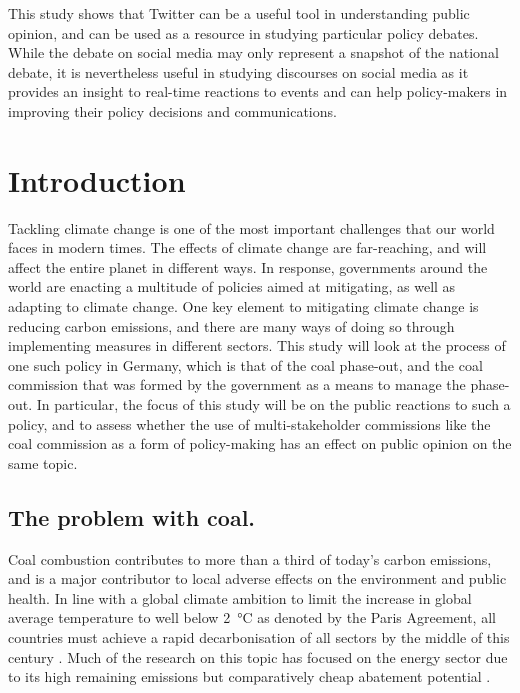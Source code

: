 \documentclass[12pt,onecolumn,twoside]{layout}
\begin{document}
This study shows that Twitter can be a useful tool in understanding public opinion, and can be used as a resource in studying particular policy debates. While the debate on social media may only represent a snapshot of the national debate, it is nevertheless useful in studying discourses on social media as it provides an insight to real-time reactions to events and can help policy-makers in improving their policy decisions and communications. 


\clearpage
\section{Introduction} \label{sec:introduction}
Tackling climate change is one of the most important challenges that our world faces in modern times. The effects of climate change are far-reaching, and will affect the entire planet in different ways. In response, governments around the world are enacting a multitude of policies aimed at mitigating, as well as adapting to climate change. One key element to mitigating climate change is reducing carbon emissions, and there are many ways of doing so through implementing measures in different sectors. This study will look at the process of one such policy in Germany, which is that of the coal phase-out, and the coal commission that was formed by the government as a means to manage the phase-out. In particular, the focus of this study will be on the public reactions to such a policy, and to assess whether the use of multi-stakeholder commissions like the coal commission as a form of policy-making has an effect on public opinion on the same topic.   

\subsection*{The problem with coal.}
Coal combustion contributes to more than a third of today's carbon emissions, and is a major contributor to local adverse effects on the environment and public health.  In line with a global climate ambition to limit the increase in global average temperature to well below \SI{2}{\celsius} as denoted by the Paris Agreement, all countries must achieve a rapid decarbonisation of all sectors by the middle of this century \citep{Figueres2017}. Much of the research on this topic has focused on the energy sector due to its high remaining emissions but comparatively cheap abatement potential \citep{Armstrong2016}.
\end{document}
